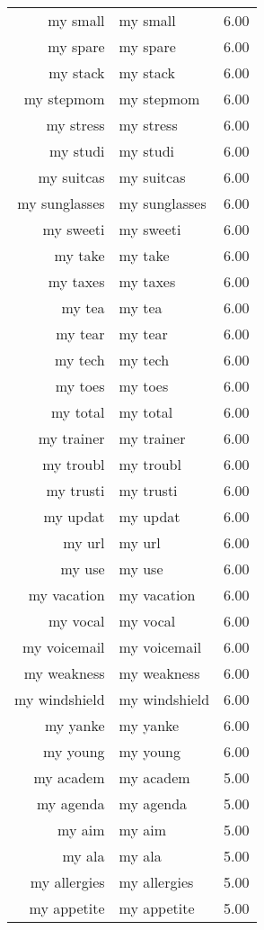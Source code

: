 \begin{table}[ht]
\begin{tabular}{rlr}
  my small & my small & 6.00 \\ 
  my spare & my spare & 6.00 \\ 
  my stack & my stack & 6.00 \\ 
  my stepmom & my stepmom & 6.00 \\ 
  my stress & my stress & 6.00 \\ 
  my studi & my studi & 6.00 \\ 
  my suitcas & my suitcas & 6.00 \\ 
  my sunglasses & my sunglasses & 6.00 \\ 
  my sweeti & my sweeti & 6.00 \\ 
  my take & my take & 6.00 \\ 
  my taxes & my taxes & 6.00 \\ 
  my tea & my tea & 6.00 \\ 
  my tear & my tear & 6.00 \\ 
  my tech & my tech & 6.00 \\ 
  my toes & my toes & 6.00 \\ 
  my total & my total & 6.00 \\ 
  my trainer & my trainer & 6.00 \\ 
  my troubl & my troubl & 6.00 \\ 
  my trusti & my trusti & 6.00 \\ 
  my updat & my updat & 6.00 \\ 
  my url & my url & 6.00 \\ 
  my use & my use & 6.00 \\ 
  my vacation & my vacation & 6.00 \\ 
  my vocal & my vocal & 6.00 \\ 
  my voicemail & my voicemail & 6.00 \\ 
  my weakness & my weakness & 6.00 \\ 
  my windshield & my windshield & 6.00 \\ 
  my yanke & my yanke & 6.00 \\ 
  my young & my young & 6.00 \\ 
  my academ & my academ & 5.00 \\ 
  my agenda & my agenda & 5.00 \\ 
  my aim & my aim & 5.00 \\ 
  my ala & my ala & 5.00 \\ 
  my allergies & my allergies & 5.00 \\ 
  my appetite & my appetite & 5.00 \\ 

\end{tabular}
\end{table}
